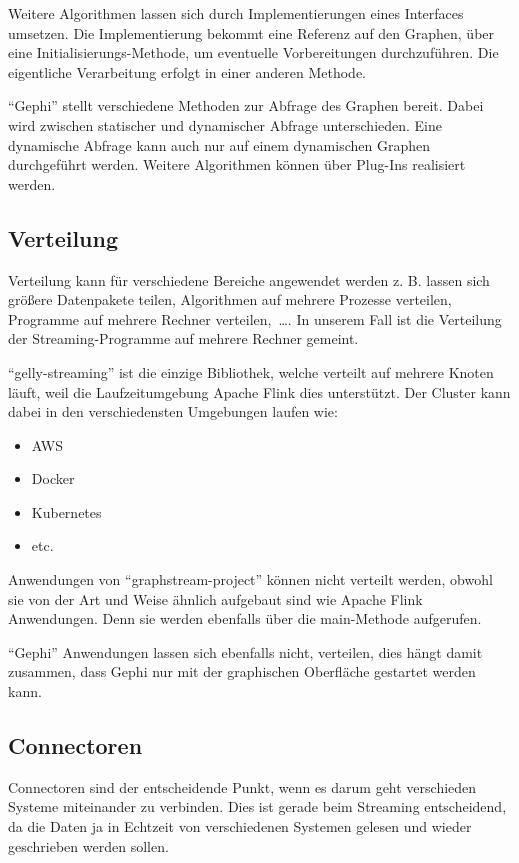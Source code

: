 Weitere Algorithmen lassen sich durch Implementierungen eines Interfaces umsetzen.
Die Implementierung bekommt eine Referenz auf den Graphen, über eine
Initialisierungs-Methode, um eventuelle Vorbereitungen durchzuführen. Die
eigentliche Verarbeitung erfolgt in einer anderen Methode.

\enquote{Gephi} stellt verschiedene Methoden zur Abfrage des Graphen bereit.
Dabei wird zwischen statischer und dynamischer Abfrage unterschieden. Eine
dynamische Abfrage kann auch nur auf einem dynamischen Graphen durchgeführt
werden. Weitere Algorithmen können über Plug-Ins realisiert werden.

\subsection{Verteilung}
Verteilung kann für verschiedene Bereiche angewendet werden z. B. lassen sich
größere Datenpakete teilen, Algorithmen auf mehrere Prozesse verteilen, Programme
auf mehrere Rechner verteilen,~\dots . In unserem Fall ist die Verteilung der
Streaming-Programme auf mehrere Rechner gemeint.

\enquote{gelly-streaming} ist die einzige Bibliothek, welche verteilt auf mehrere
Knoten läuft, weil die Laufzeitumgebung Apache Flink dies unterstützt.
Der Cluster kann dabei in den verschiedensten Umgebungen laufen wie: \parencite{Foundation2018}

\begin{itemize}
\item AWS
\item Docker
\item Kubernetes
\item etc.
\end{itemize}

Anwendungen von \enquote{graphstream-project} können nicht verteilt werden,
obwohl sie von der Art und Weise ähnlich aufgebaut sind wie Apache Flink
Anwendungen. Denn sie werden ebenfalls über die main-Methode aufgerufen.

\enquote{Gephi} Anwendungen lassen sich ebenfalls nicht, verteilen, dies hängt
damit zusammen, dass Gephi nur mit der graphischen Oberfläche gestartet werden
kann.

\subsection{Connectoren}
Connectoren sind der entscheidende Punkt, wenn es darum geht verschieden Systeme
miteinander zu verbinden. Dies ist gerade beim Streaming entscheidend, da die
Daten ja in Echtzeit von verschiedenen Systemen gelesen und wieder geschrieben
werden sollen.

